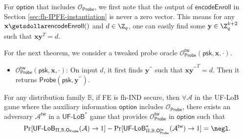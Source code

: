 
For $\textsf{option}$ that includes $\mathcal{O}_{\textsf{Probe}}$, we first note that the output of $\textsf{encodeEnroll}$ in Section \ref{sec:fh-IPFE-instantiation} is never a zero vector. This means for any $\mathbf{x} \getsdollar \textsf{encodeEnroll}()$ and $d \in \Z_q$, one can easily find some $\mathbf{y} \in \Z_q^{k+2}$ such that $\mathbf{x}\mathbf{y}^T = d$.

For the next theorem, we consider a tweaked probe oracle $\mathcal{O}_{\textsf{Probe}}^\textsf{tw} (\textsf{psk}, \mathbf{x}, \cdot)$.

\begin{itemize}

	\item $\mathcal{O}_{\textsf{Probe}}^\textsf{tw} (\textsf{psk}, \mathbf{x}, \cdot)$: On input $d$, it first finds $\mathbf{y}^{\prime\prime}$ such that $\mathbf{x}{\mathbf{y}^{\prime\prime}}^T = d$. Then it returns $\textsf{Probe}(\textsf{psk}, {\mathbf{y}^{\prime\prime}})$.

\end{itemize}

\begin{theorem}
\label{thm:ind-uf-lob3}

For any distribution family $\mathbb{B}$, if \textsf{FE} is fh-IND secure, then $\forall \mathcal{A}$ in the \textsf{UF-LoB} game where the auxiliary information $\textsf{option}$ includes $\mathcal{O}_\textsf{Probe}$, there exists an adversary $\mathcal{A}^\textsf{tw}$ in a $\textsf{UF-LoB}^*$ game that provides $\mathcal{O}_\textsf{Probe}^\textsf{tw}$ in $\textsf{option}$ such that
\[
	\Pr[\textsf{UF-LoB}_{\Pi, \mathbb{B}, \textsf{O}_{\textsf{Probe}}}(\mathcal{A}) \to 1] - \Pr[\textsf{UF-LoB}^*_{\Pi, \mathbb{B}, \textsf{O}_{\textsf{Probe}}^\textsf{tw} }(\mathcal{A}^\textsf{tw} ) \to 1] = \negl.
\]	

\end{theorem}


